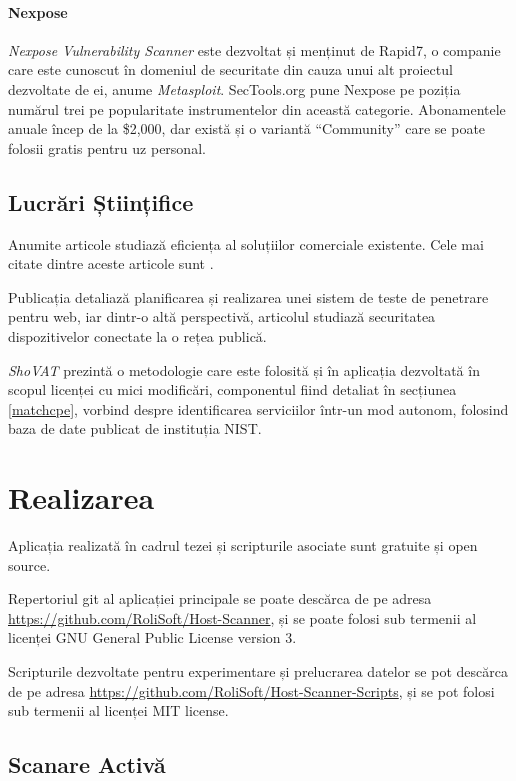 	\paragraph*{Nexpose} \textit{Nexpose Vulnerability Scanner}\cite{nexpose} este dezvoltat și menținut de Rapid7, o companie care este cunoscut în domeniul de securitate din cauza unui alt proiectul dezvoltate de ei, anume \textit{Metasploit}. SecTools.org pune Nexpose pe poziția numărul trei pe popularitate instrumentelor din această categorie. Abonamentele anuale încep de la \$2,000, dar există și o variantă ``Community'' care se poate folosii gratis pentru uz personal.
	
\subsection*{Lucrări Științifice}
	
	Anumite articole studiază eficiența al soluțiilor comerciale existente. Cele mai citate dintre aceste articole sunt \cite{holm11,bau10,doupe10}.
	
	Publicația \cite{kals06} detaliază planificarea și realizarea unei sistem de teste de penetrare pentru web, iar dintr-o altă perspectivă, articolul \cite{guo05} studiază securitatea dispozitivelor conectate la o rețea publică.
	
	\textit{ShoVAT}\cite{shovat15} prezintă o metodologie care este folosită și în aplicația dezvoltată în scopul licenței cu mici modificări, componentul fiind detaliat în secțiunea \ref{matchcpe}, vorbind despre identificarea serviciilor într-un mod autonom, folosind baza de date publicat de instituția NIST.

\section*{Realizarea}

	Aplicația realizată în cadrul tezei și scripturile asociate sunt gratuite și open source.
	
	Repertoriul git al aplicației principale se poate descărca de pe adresa \url{https://github.com/RoliSoft/Host-Scanner}, și se poate folosi sub termenii al licenței GNU General Public License version 3\cite{gplv3}.
	
	Scripturile dezvoltate pentru experimentare și prelucrarea datelor se pot descărca de pe adresa \url{https://github.com/RoliSoft/Host-Scanner-Scripts}, și se pot folosi sub termenii al licenței MIT license\cite{mit}.

\subsection*{Scanare Activă}

